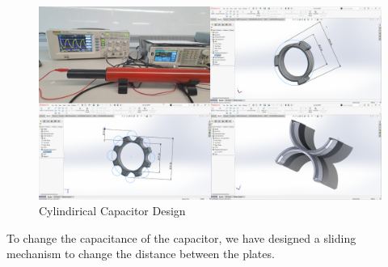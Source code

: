 \begin{figure}[h]
    \centering
    \includegraphics[width=0.9\linewidth]{assets/cylindirical-design.png}
    \caption{Cylindirical Capacitor Design}
    \label{fig:cylindirical-design}
\end{figure}

To change the capacitance of the capacitor, we have designed a sliding mechanism to change the distance between the plates.
